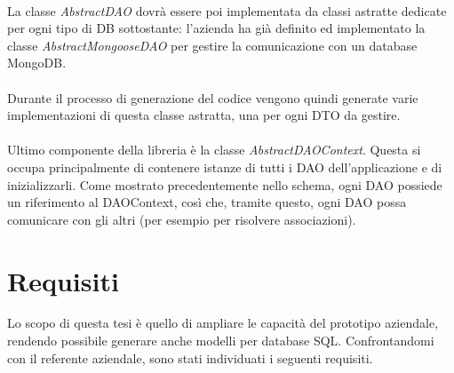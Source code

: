 \documentclass[a4paper, 12pt]{report}
\begin{document}
      \paragraph*{}
      La classe \emph{AbstractDAO} dovrà essere poi implementata da classi astratte dedicate per ogni tipo di DB sottostante: l'azienda ha già definito ed implementato la classe \emph{AbstractMongooseDAO} per gestire la comunicazione con un database MongoDB.
      \paragraph*{}
      Durante il processo di generazione del codice vengono quindi generate varie implementazioni di questa classe astratta, una per ogni DTO da gestire.
      \paragraph*{}
      Ultimo componente della libreria è la classe \emph{AbstractDAOContext}. Questa si occupa principalmente di contenere istanze di tutti i DAO dell'applicazione e di inizializzarli.
      Come mostrato precedentemente nello schema, ogni DAO possiede un riferimento al DAOContext, così che, tramite questo, ogni DAO possa comunicare con gli altri (per esempio per risolvere associazioni).
    \section{Requisiti}
      Lo scopo di questa tesi è quello di ampliare le capacità del prototipo aziendale, rendendo possibile generare anche modelli per database SQL.
      Confrontandomi con il referente aziendale, sono stati individuati i seguenti requisiti.
\end{document}
